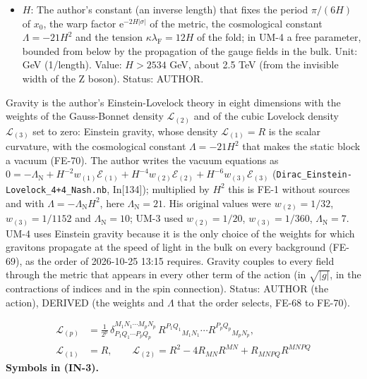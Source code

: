 \documentclass[
  10pt,
]{article}
\begin{document}
\begin{itemize}
  \((1, 1/32, 1/1152)\). Status: AUTHOR (the form), DERIVED (the values
  that the order of 2026-10-25 selects).
\item
  \(H\): The author's constant (an inverse length) that fixes the period
  \(\pi/(6H)\) of \(x_0\), the warp factor
  \(\mathrm{e}^{-2H\lvert\sigma\rvert}\) of the metric, the cosmological
  constant \(\Lambda = -21H^2\) and the tension
  \(\kappa\lambda_{\mathrm{F}} = 12H\) of the fold; in UM-4 a free
  parameter, bounded from below by the propagation of the gauge fields
  in the bulk. Unit: GeV (1/length). Value: \(H > 2534\) GeV, about 2.5
  TeV (from the invisible width of the Z boson). Status: AUTHOR.
\end{itemize}

Gravity is the author's Einstein-Lovelock theory in eight dimensions
with the weights of the Gauss-Bonnet density \(\mathcal{L}_{(2)}\) and
of the cubic Lovelock density \(\mathcal{L}_{(3)}\) set to zero:
Einstein gravity, whose density \(\mathcal{L}_{(1)} = R\) is the scalar
curvature, with the cosmological constant \(\Lambda = -21H^2\) that
makes the static block a vacuum (FE-70). The author writes the vacuum
equations as
\(0 = -\Lambda_{\mathrm{N}} + H^{-2}w_{(1)}\mathcal{E}_{(1)} + H^{-4}w_{(2)}\mathcal{E}_{(2)} + H^{-6}w_{(3)}\mathcal{E}_{(3)}\)
(\texttt{Dirac\_Einstein-Lovelock\_4+4\_Nash.nb}, In{[}134{]});
multiplied by \(H^2\) this is FE-1 without sources and with
\(\Lambda = -\Lambda_{\mathrm{N}}H^2\), here
\(\Lambda_{\mathrm{N}} = 21\). His original values were
\(w_{(2)} = 1/32\), \(w_{(3)} = 1/1152\) and
\(\Lambda_{\mathrm{N}} = 10\); UM-3 used \(w_{(2)} = 1/20\),
\(w_{(3)} = 1/360\), \(\Lambda_{\mathrm{N}} = 7\). UM-4 uses Einstein
gravity because it is the only choice of the weights for which gravitons
propagate at the speed of light in the bulk on every background (FE-69),
as the order of 2026-10-25 13:15 requires. Gravity couples to every
field through the metric that appears in every other term of the action
(in \(\sqrt{\lvert g\rvert}\), in the contractions of indices and in the
spin connection). Status: AUTHOR (the action), DERIVED (the weights and
\(\Lambda\) that the order selects, FE-68 to FE-70).

\[
\begin{aligned}
\mathcal{L}_{(p)} &= \frac{1}{2^{p}}\,\delta^{M_1N_1\cdots M_pN_p}_{P_1Q_1\cdots P_pQ_p}\,
 R^{P_1Q_1}{}_{M_1N_1}\cdots R^{P_pQ_p}{}_{M_pN_p},\\
\mathcal{L}_{(1)} &= R,\qquad \mathcal{L}_{(2)} = R^2 - 4R_{MN}R^{MN} + R_{MNPQ}R^{MNPQ}
\end{aligned} \tag{IN-3}
\] \textbf{Symbols in (IN-3).}
\end{document}
